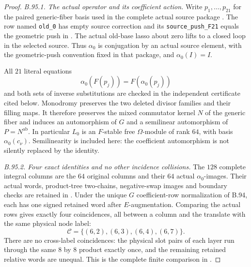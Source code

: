 \begin{proof}
\emph{B.95.1. The actual operator and its coefficient action.}
Write $p_1,\ldots,p_{21}$ for the paired generic-fiber basis used in
the complete actual source package
.
The row named \texttt{old\_0} has empty source correction and its
\texttt{source\_push\_F21} equals the geometric push in
.
The actual old-base lasso about zero lifts to a closed loop in the
selected source. Thus $\alpha_0$ is conjugation by an actual source
element, with the geometric-push convention fixed in that package,
and $\alpha_0(I)=I$.

All $21$ literal equations
\[
                    \alpha_0(F(p_j))=F(\alpha_0(p_j))
\]
and both sets of inverse substitutions are checked in the independent
certificate cited below. Monodromy preserves the two deleted divisor
families and their filling maps. It therefore preserves the mixed
commutator kernel $N$ of the generic fiber and induces an automorphism
of $G$ and a semilinear automorphism of $P=N^{\mathrm{ab}}$.
In particular $L_0$ is an $F$-stable free $\Omega$-module of rank $64$,
with basis $\alpha_0(c_\nu)$. Semilinearity is included here: the
coefficient automorphism is not silently replaced by the identity.

\emph{B.95.2. Four exact identities and no other incidence collisions.}
The $128$ complete integral columns are the $64$ original columns and
their $64$ actual $\alpha_0$-images. Their actual words, product-tree
two-chains, negative-swap images and boundary checks are retained in
. Under the unique
$G$ coefficient-row normalization of B.94, each has one signed retained
word after $E$-augmentation. Comparing the actual rows gives exactly
four coincidences, all between a column and the translate with the
same physical node label:
\[
                  \mathcal C=\{(6,2),(6,3),(6,4),(6,7)\}.
\]
There are no cross-label coincidences: the physical slot pairs of each
layer run through the same $8$ by $8$ product exactly once, and the
remaining retained relative words are unequal. This is the complete
finite comparison in
.


\end{proof}

